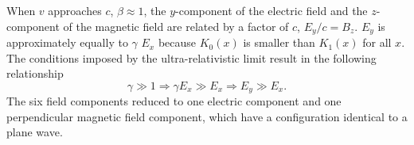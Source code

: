     When $v$ approaches $c$, $\beta \approx 1$, the $y$-component of the 
      electric field and the $z$-component of the magnetic field are related by 
      a factor of $c$, $E_{y}/c=B_{z}$.
    $E_{y}$ is approximately equally to $\gamma$ $E_{x}$ because $K_{0}(x)$ is 
      smaller than $K_{1}(x)$ for all $x$. 
    The conditions imposed by the ultra-relativistic limit result in the 
      following relationship
    \begin{equation} \label{eq:ultraRelAprox}
      \gamma \gg 1 \Rightarrow \gamma E_{x} \gg E_{x} \Rightarrow E_{y} \gg E_{x} \textrm{.}
    \end{equation}
    The six field components reduced to one electric component and one 
      perpendicular magnetic field component, which have a configuration 
      identical to a plane wave. 

